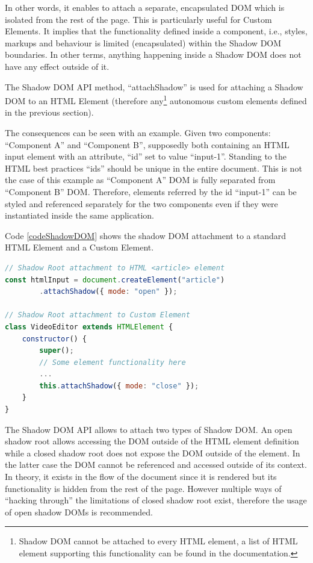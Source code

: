 In other words, it enables to attach a separate, encapsulated DOM which is isolated from the rest of the page. This is particularly useful for Custom Elements. It implies that the functionality defined inside a component, i.e., styles, markups and behaviour is limited (encapsulated) within the Shadow DOM boundaries. In other terms, anything happening inside a Shadow DOM does not have any effect outside of it.

The Shadow DOM API method, “attachShadow” is used for attaching a Shadow DOM to an HTML Element (therefore any\footnote{Shadow DOM cannot be attached to every HTML element, a list of HTML element supporting this functionality can be found in the documentation.} autonomous custom elements defined in the previous section).

The consequences can be seen with an example. Given two components: “Component A” and “Component B”, supposedly both containing an HTML input element with an attribute, “id” set to value “input-1”. Standing to the HTML best practices “ids” should be unique in the entire document. This is not the case of this example as “Component A” DOM is fully separated from “Component B” DOM. Therefore, elements referred by the id “input-1” can be styled and referenced separately for the two components even if they were instantiated inside the same application.

Code \ref{codeShadowDOM} shows the shadow DOM attachment to a standard HTML Element and a Custom Element.
\\
\begin{lstlisting}[caption={Shadow DOM attachment},label={codeShadowDOM}, language=JavaScript]
// Shadow Root attachment to HTML <article> element
const htmlInput = document.createElement("article")
        .attachShadow({ mode: "open" });

// Shadow Root attachment to Custom Element
class VideoEditor extends HTMLElement {
    constructor() {
        super();
        // Some element functionality here
        ...
        this.attachShadow({ mode: "close" });
    }
}
\end{lstlisting}

The Shadow DOM API allows to attach two types of Shadow DOM. An open shadow root allows accessing the DOM outside of the HTML element definition while a closed shadow root does not expose the DOM outside of the element. In the latter case the DOM cannot be referenced and accessed outside of its context. In theory, it exists in the flow of the document since it is rendered but its functionality is hidden from the rest of the page. However multiple ways of “hacking through” the limitations of closed shadow root exist, therefore the usage of open shadow DOMs is recommended.

